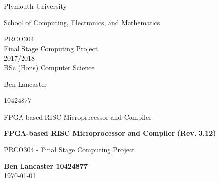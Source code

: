 \documentclass[11pt,a4paper]{report}
\newcommand{\dlatestv}{3.12}
\begin{document}

\makeatletter
\DeclareRobustCommand*{\nameref}{%
\color{blue}%
        \@ifstar\T@nameref\T@nameref
        }%
\makeatother

\begin{titlepage}
\begin{center}
\vspace*{2cm}

\Huge
Plymouth University

\vspace{2cm}
\huge
School of Computing, Electronics, and Mathematics

\vspace{2cm}
\huge
PRCO304\\
Final Stage Computing Project\\
2017/2018\\

\vspace{1.5cm}
\huge
BSc (Hons) Computer Science


\Large
\vspace{1.5cm}
Ben Lancaster

\vspace{1cm}
10424877

\vspace{1cm}
FPGA-based RISC Microprocessor and Compiler




\end{center}
\end{titlepage}


\newpage
\begin{titlepage}
\begin{center}

\vspace*{5cm}
\Large

{\color{blue9d}
\textbf{
FPGA-based RISC Microprocessor and Compiler (Rev. \dlatestv{})
}
}

\vspace{0.4cm}
\large
PRCO304 - Final Stage Computing Project

\vspace{4cm}
\textbf{Ben Lancaster 10424877}\\
\today 


\end{center}

\end{titlepage}
\end{document}
